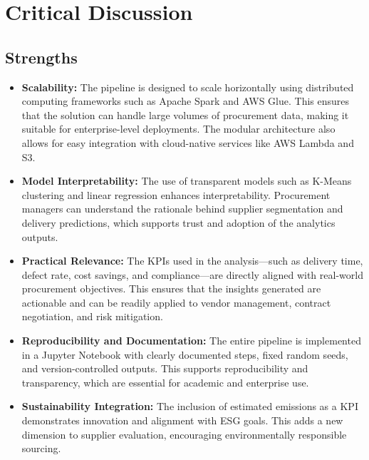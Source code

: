 \documentclass[10pt, twocolumn]{article}
\begin{document}
 
\section{Critical Discussion}

\subsection*{Strengths}
\begin{itemize}
    \item \textbf{Scalability:} The pipeline is designed to scale horizontally using distributed computing frameworks such as Apache Spark and AWS Glue. This ensures that the solution can handle large volumes of procurement data, making it suitable for enterprise-level deployments. The modular architecture also allows for easy integration with cloud-native services like AWS Lambda and S3.

    \item \textbf{Model Interpretability:} The use of transparent models such as K-Means clustering and linear regression enhances interpretability. Procurement managers can understand the rationale behind supplier segmentation and delivery predictions, which supports trust and adoption of the analytics outputs.

    \item \textbf{Practical Relevance:} The KPIs used in the analysis—such as delivery time, defect rate, cost savings, and compliance—are directly aligned with real-world procurement objectives. This ensures that the insights generated are actionable and can be readily applied to vendor management, contract negotiation, and risk mitigation.

    \item \textbf{Reproducibility and Documentation:} The entire pipeline is implemented in a Jupyter Notebook with clearly documented steps, fixed random seeds, and version-controlled outputs. This supports reproducibility and transparency, which are essential for academic and enterprise use.

    \item \textbf{Sustainability Integration:} The inclusion of estimated emissions as a KPI demonstrates innovation and alignment with ESG goals. This adds a new dimension to supplier evaluation, encouraging environmentally responsible sourcing.
\end{itemize}
\end{document}
